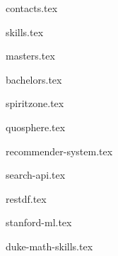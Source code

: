 \documentclass[11pt]{article}
\begin{document}
{contacts.tex}



{skills.tex}



{masters.tex}


{bachelors.tex}



{spiritzone.tex}

{quosphere.tex}



{recommender-system.tex}

{search-api.tex}

{restdf.tex}



{stanford-ml.tex}

{duke-math-skills.tex}
\end{document}
